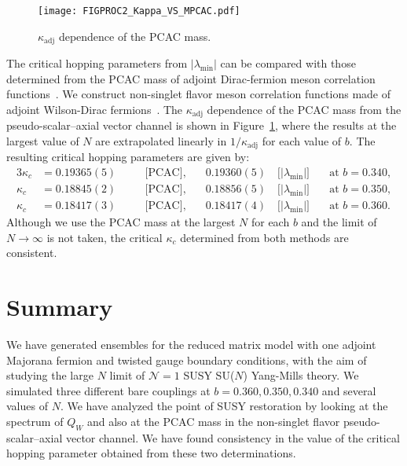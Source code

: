 \documentclass[a4paper,11pt]{article}
\begin{document}
\begin{figure}[t]
    \centering
    \texttt{[image: FIGPROC2\_Kappa\_VS\_MPCAC.pdf]}
    \caption{$\kappa_{\mathrm{adj}}$ dependence of the PCAC mass.}
    \label{fig:PCAC}
\end{figure}

The critical hopping parameters from $|\lambda_\mathrm{min}|$  can be compared
with those determined from the PCAC mass of adjoint Dirac-fermion meson correlation functions~\cite{Ali:2019agk}.
We construct non-singlet flavor meson correlation functions made of adjoint Wilson-Dirac fermions~\cite{Gonzalez-Arroyo:2015bya,Perez:2020vbn}.
The $\kappa_{\mathrm{adj}}$ dependence of the PCAC mass from the pseudo-scalar--axial vector channel is shown in Figure~\ref{fig:PCAC},
where the results at the largest value of $N$ are extrapolated linearly in $1/\kappa_{\mathrm{adj}}$ for each value of $b$.
The resulting critical hopping parameters are given by:
\begin{alignat}{3}
    \kappa_c &= 0.19365(5)&\quad& \mbox{[PCAC]},&\quad  0.19360(5) \quad\mbox{[|$\lambda_{\mathrm{min}}|$]}\quad & \mbox{at $b=0.340$},\\
    \kappa_c &= 0.18845(2)&\quad& \mbox{[PCAC]},&\quad  0.18856(5) \quad\mbox{[|$\lambda_{\mathrm{min}}|$]}\quad & \mbox{at $b=0.350$},\\
    \kappa_c &= 0.18417(3)&\quad& \mbox{[PCAC]},&\quad  0.18417(4) \quad\mbox{[|$\lambda_{\mathrm{min}}|$]}\quad & \mbox{at $b=0.360$}.
\end{alignat}
Although we use the PCAC mass at the largest $N$ for each $b$ and
the limit of $N\to \infty$ is not taken, the critical $\kappa_c$ determined
from both methods are consistent.



\section{Summary}
\label{sec:3}
We have generated ensembles for the reduced matrix model with one adjoint Majorana fermion and twisted gauge boundary conditions, with the 
aim of studying the large $N$ limit of $\mathcal{N} = 1$ SUSY SU($N$) Yang-Mills theory.
We simulated three different bare couplings at $b=0.360, 0.350, 0.340$ and several values of $N$. 
We have analyzed the point of SUSY restoration by looking at the spectrum of $Q_W$ and also at the PCAC mass in the non-singlet 
flavor pseudo-scalar--axial vector channel.
We have found consistency in the value of the critical hopping parameter obtained  from these two determinations.
\end{document}

